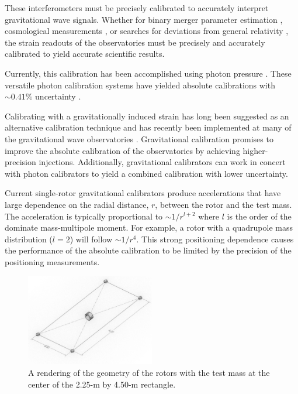 \documentclass[superscriptaddress, twocolumn, prd]{revtex4-1}
\begin{document}
These interferometers must be precisely calibrated to accurately interpret gravitational wave signals. Whether for binary merger parameter estimation \cite{abbott2020population}, cosmological measurements \cite{abbott2021gravitational, ligo2017gravitational}, or searches for deviations from general relativity \cite{abbott2020tests}, the strain readouts of the observatories must be precisely and accurately calibrated to yield accurate scientific results.

Currently, this calibration has been accomplished using photon pressure \cite{PCal}. These versatile photon calibration systems have yielded absolute calibrations with $\sim0.41\%$ uncertainty \cite{Bhattacharjee_2020}. 

Calibrating with a gravitationally induced strain has long been suggested as an alternative calibration technique \cite{hirakawa1980dynamical, kuroda1985experimental, mio1987experimental, astone1991evaluation, astone1998experimental, Matone_2007} and has recently been implemented at many of the gravitational wave observatories \cite{Estevez_2018, estevez2021newtonian, PhysRevD.98.022005, ncal}. Gravitational calibration  promises to improve the absolute calibration of the observatories by achieving higher-precision injections. Additionally, gravitational calibrators can work in concert with photon calibrators to yield a combined calibration with lower uncertainty.

Current single-rotor gravitational calibrators \cite{Estevez_2018, estevez2021newtonian, PhysRevD.98.022005, ncal} produce accelerations that have large dependence on the radial distance, $r$, between the rotor and the test mass. The acceleration is typically proportional to $\sim1/r^{l+2}$ where $l$ is the order of the dominate mass-multipole moment. For example, a rotor with a quadrupole mass distribution ($l=2$) will follow $\sim1/r^4$. This strong positioning dependence causes the performance of the absolute calibration to be limited by the precision of the positioning measurements. 

\begin{figure}[!h]
\centering \includegraphics[width=0.5\textwidth]{Super4ModelNew.pdf}
\caption{A rendering of the geometry of the rotors with the test mass at the center of the 2.25-m by 4.50-m rectangle.}
\label{cad} 
\end{figure}
\end{document}
